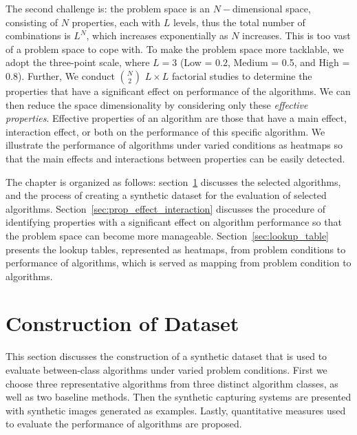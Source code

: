 The second challenge is: the problem space is an $N-$dimensional space, consisting of $N$ properties, each with $L$ levels, thus the total number of combinations is $L^N$, which increases exponentially as $N$ increases. This is too vast of a problem space to cope with. To make the problem space more tacklable, we adopt the three-point scale, where $L=3$ (Low = 0.2, Medium = 0.5, and High = 0.8). Further, We conduct $\binom{N}{2}$ $L\times L$ factorial studies to determine the properties that have a significant effect on performance of the algorithms. We can then reduce the space dimensionality by considering only these \textit{effective properties}. Effective properties of an algorithm are those that have a main effect, interaction effect, or both on the performance of this specific algorithm. We illustrate the performance of algorithms under varied conditions as heatmaps so that the main effects and interactions between properties can be easily detected.

The chapter is organized as follows: section~\ref{sec:create_synth_dataset} discusses the selected algorithms, and the process of creating a synthetic dataset for the evaluation of selected algorithms. Section~\ref{sec:prop_effect_interaction} discusses the procedure of identifying properties with a significant effect on algorithm performance so that the problem space can become more manageable. Section~\ref{sec:lookup_table} presents the lookup tables, represented as heatmaps, from problem conditions to performance of algorithms, which is served as mapping from problem condition to algorithms.

\section{Construction of Dataset}
\label{sec:create_synth_dataset}
This section discusses the construction of a synthetic dataset that is used to evaluate between-class algorithms under varied problem conditions. First we choose three representative algorithms from three distinct algorithm classes, as well as two baseline methods. Then the synthetic capturing systems are presented with  synthetic images generated as examples. Lastly, quantitative measures used to evaluate the performance of algorithms are proposed.


